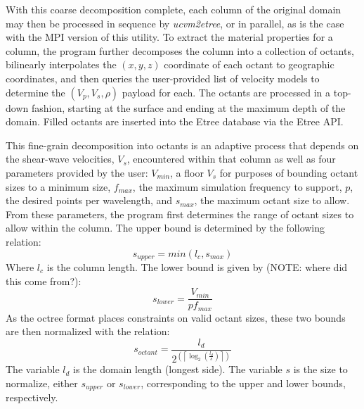 With this coarse decomposition complete, each column of the original domain may then be processed in sequence by \emph{ucvm2etree}, or in parallel, as is the case with the MPI version of this utility. To extract the material properties for a column, the program further decomposes the column into a collection of octants, bilinearly interpolates the $(x,y,z)$ coordinate of each octant to geographic coordinates, and then queries the user-provided list of velocity models to determine the $(V_p, V_s, \rho)$ payload for each. The octants are processed in a top-down fashion, starting at the surface and ending at the maximum depth of the domain. Filled octants are inserted into the Etree database via the Etree API.

This fine-grain decomposition into octants is an adaptive process that depends on the shear-wave velocities, $V_s$, encountered within that column as well as four parameters provided by the user: $V_{min}$, a floor $V_s$ for purposes of bounding octant sizes to a minimum size, $f_{max}$, the maximum simulation frequency to support, $p$, the desired points per wavelength, and $s_{max}$, the maximum octant size to allow. From these parameters, the program first determines the range of octant sizes to allow within the column. The upper bound is determined by the following relation:
\begin{equation}\label{eq:octant_upper}
s_{upper} = min(l_c, s_{max})
\end{equation}
Where $l_c$ is the column length. The lower bound is given by (NOTE: where did this come from?):
\begin{equation}\label{eq:octant_lower}
s_{lower} = \frac{V_{min}}{p f_{max}}
\end{equation}
As the octree format places constraints on valid octant sizes, these two bounds are then normalized with the relation:
\begin{equation}\label{eq:octant_size}
s_{octant} = \frac{l_{d}}{ 2^{\left( \left\lceil \log_{2}(\frac{l_{d}}{s}) \right\rceil \right)} }
\end{equation}
The variable $l_{d}$ is the domain length (longest side). The variable $s$ is the size to normalize, either $s_{upper}$ or $s_{lower}$, corresponding to the upper and lower bounds, respectively.

